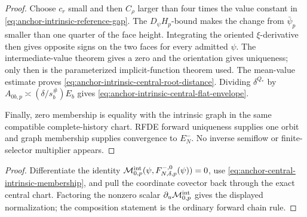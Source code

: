 \begin{proof}
Choose \(c_r\) small and then \(C_\rho\) larger than four times the value
constant in \cref{eq:anchor-intrinsic-reference-gap}.  The
\(D_\psi H_p\)-bound makes the change from \(\bar\psi_p\) smaller than one
quarter of the face height.  Integrating the oriented \(\xi\)-derivative
then gives opposite signs on the two faces for every admitted \(\psi\).
The intermediate-value theorem gives a zero and the orientation gives
uniqueness; only then is the parameterized implicit-function theorem used.
The mean-value estimate proves
\cref{eq:anchor-intrinsic-central-root-distance}.  Dividing
\(\delta^{Q_*}\) by
\(A_{0b,p}\asymp(\delta/s_b^\#)E_b\) gives
\cref{eq:anchor-intrinsic-central-flat-envelope}.

Finally, zero membership is equality with the intrinsic graph in the same
compatible complete-history chart.  RFDE forward uniqueness supplies one
orbit and graph membership supplies convergence to \(E_N^-\).  No inverse
semiflow or finite-selector multiplier appears.
\end{proof}


\begin{proof}
Differentiate the identity
\(\mathcal M_{0,p}^{\rm int}
  (\psi,F_{N,\delta,p}^{-,0}(\psi))=0\), use
\cref{eq:anchor-central-intrinsic-membership}, and pull the coordinate
covector back through the exact central chart.  Factoring the nonzero scalar
\(\partial_u\mathcal M_{0,p}^{\rm int}\) gives the displayed normalization;
the composition statement is the ordinary forward chain rule.
\end{proof}
